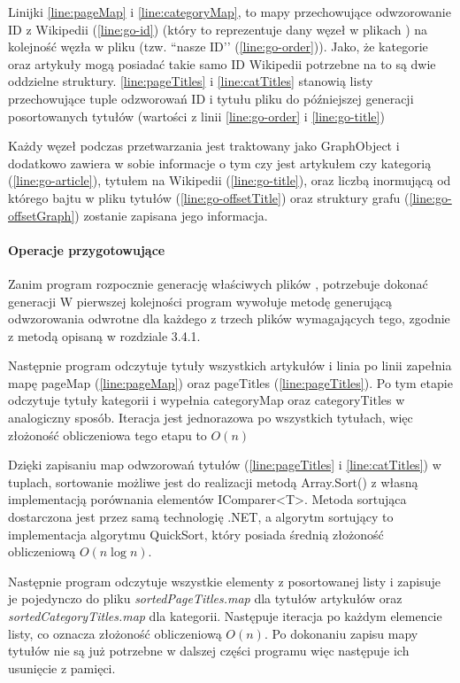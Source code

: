 Linijki \ref{line:pageMap} i \ref{line:categoryMap}, to mapy przechowujące odwzorowanie ID z Wikipedii (\ref{line:go-id}) (który to reprezentuje dany węzeł w plikach ) na kolejność węzła w pliku  (tzw. ``nasze ID’’ (\ref{line:go-order})). Jako, że kategorie oraz artykuły mogą posiadać takie samo ID Wikipedii potrzebne na to są dwie oddzielne struktury. \ref{line:pageTitles} i \ref{line:catTitles} stanowią listy przechowujące tuple odzworowań ID i tytułu pliku do późniejszej generacji posortowanych tytułów (wartości z linii \ref{line:go-order} i \ref{line:go-title})

Każdy węzeł podczas przetwarzania jest traktowany jako GraphObject i dodatkowo zawiera w sobie informacje o tym czy jest artykułem czy kategorią (\ref{line:go-article}), tytułem na Wikipedii (\ref{line:go-title}), oraz liczbą inormującą od którego bajtu w pliku tytułów  (\ref{line:go-offsetTitle}) oraz struktury grafu  (\ref{line:go-offsetGraph}) zostanie zapisana jego informacja.

\paragraph{Operacje przygotowujące}
Zanim program rozpocznie generację właściwych plików , potrzebuje dokonać generacji
W pierwszej kolejności program wywołuje metodę generującą odwzorowania odwrotne dla każdego z trzech plików wymagających tego, zgodnie z metodą opisaną w rozdziale 3.4.1.

Następnie program odczytuje tytuły wszystkich artykułów i linia po linii zapełnia mapę pageMap (\ref{line:pageMap}) oraz pageTitles (\ref{line:pageTitles}). Po tym etapie odczytuje tytuły kategorii i wypełnia categoryMap oraz categoryTitles w analogiczny sposób. Iteracja jest jednorazowa po wszystkich tytułach, więc złożoność obliczeniowa tego etapu to $O(n)$

Dzięki zapisaniu map odwzorowań tytułów (\ref{line:pageTitles} i \ref{line:catTitles}) w tuplach, sortowanie możliwe jest do realizacji metodą Array.Sort() z własną implementacją porównania elementów IComparer<T>. Metoda sortująca dostarczona jest przez samą technologię .NET, a algorytm sortujący to implementacja algorytmu QuickSort, który posiada średnią złożoność obliczeniową $O(n\log n)$.

Następnie program odczytuje wszystkie elementy z posortowanej listy i zapisuje je pojedynczo do pliku \textit{sortedPageTitles.map} dla tytułów artykułów oraz \textit{sortedCategoryTitles.map} dla kategorii. Następuje iteracja po każdym elemencie listy, co oznacza złożoność obliczeniową $O(n)$. Po dokonaniu zapisu mapy tytułów nie są już potrzebne w dalszej części programu więc następuje ich usunięcie z pamięci.

